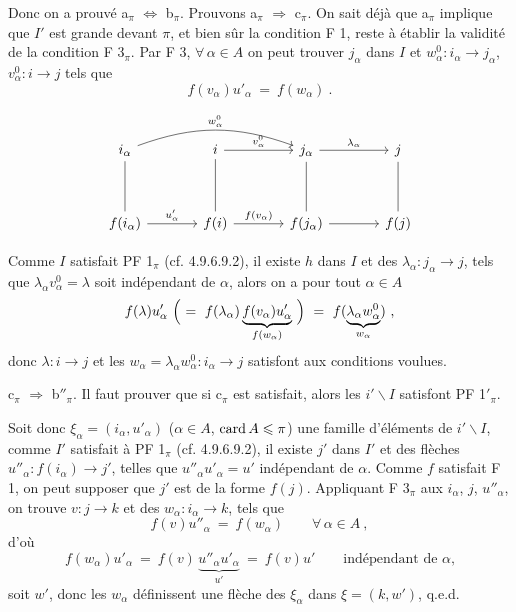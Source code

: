 Donc on a prouvé a$_\pi$ $\Longleftrightarrow$ b$_\pi$. Prouvons a$_\pi$ $\Longrightarrow$ c$_\pi$. On sait déjà que a$_\pi$ implique que $I'$ est grande devant $\pi$, et bien sûr la condition F 1, reste à établir la validité de la condition F 3$_\pi$. Par F 3, $\forall\, \alpha \in A$ on peut trouver $j_\alpha$ dans $I$ et $w^0_\alpha : i_\alpha \longrightarrow j_\alpha$, $v^0_\alpha : i \longrightarrow j$ tels que %
\[
f(v_\alpha)u'_\alpha \ = \ f(w_\alpha) \ .
\]


\[
\begin{tikzcd}[column sep=large, row sep=huge]
i_\alpha \arrow[rr, bend left=20, "w^0_\alpha"] \arrow[d, dash] & i \arrow[r, "v^0_\alpha"] \arrow[d, dash] & j_\alpha \arrow[r, "\lambda_\alpha"] \arrow[d, dash] & j \arrow[d, dash] \\
f(i_\alpha) \arrow[r, "u'_\alpha"] & f(i) \arrow[r, "f(v_\alpha)"] & f(j_\alpha) \arrow[r] & f(j)
\end{tikzcd}
\]

Comme $I$ satisfait PF 1$_\pi$ (cf. 4.9.6.9.2), il existe $h$ dans $I$ et des $\lambda_\alpha : j_\alpha \longrightarrow j$, tels que $\lambda_\alpha v^0_\alpha = \lambda$ soit indépendant de $\alpha$, alors on a pour tout $\alpha \in A$ %
\[
f(\lambda)u'_\alpha \ \Bigl( \ = \ f(\lambda_\alpha)\underbrace{f(v_\alpha)u'_\alpha}_{f(w_\alpha)} \ \Bigr) \ = \ f(\underbrace{\lambda_\alpha w^0_\alpha}_{w_\alpha}) \ ,
\]
donc $\lambda : i \longrightarrow j$ et les $w_\alpha = \lambda_\alpha w^0_\alpha : i_\alpha \longrightarrow j$ satisfont aux conditions voulues.

c$_\pi$ $\Longrightarrow$ b$''_\pi$. Il faut prouver que si c$_\pi$ est satisfait, alors les $i'\backslash I$ satisfont PF 1$'_\pi$.

Soit donc $\xi_\alpha = (i_\alpha, u'_\alpha)$ ($\alpha \in A$, $\operatorname{card} A \leqslant \pi$) une famille d'éléments de $i'\backslash I$, comme $I'$ satisfait à PF 1$_\pi$ (cf. 4.9.6.9.2), il existe $j'$ dans $I'$ et des flèches $u''_\alpha : f(i_\alpha) \longrightarrow j'$, telles que $u''_\alpha u'_\alpha = u'$ indépendant de $\alpha$. Comme $f$ satisfait F 1, on peut supposer que $j'$ est de la forme $f(j)$. Appliquant F 3$_\pi$ aux $i_\alpha$, $j$, $u''_\alpha$, on trouve $v : j \longrightarrow k$ et des $w_\alpha : i_\alpha \longrightarrow k$, tels que
\[
f(v)u''_\alpha \ = \ f(w_\alpha) \qquad \forall\, \alpha \in A \ ,
\]
d'où
\[
f(w_\alpha)u'_\alpha \ = \ f(v)\,\underbrace{u''_\alpha u'_\alpha}_{u'} \ = \ f(v)u' \qquad \text{indépendant de $\alpha$,}
\]
soit $w'$, donc les $w_\alpha$ définissent une flèche des $\xi_\alpha$ dans $\xi = (k, w')$, q.e.d.

